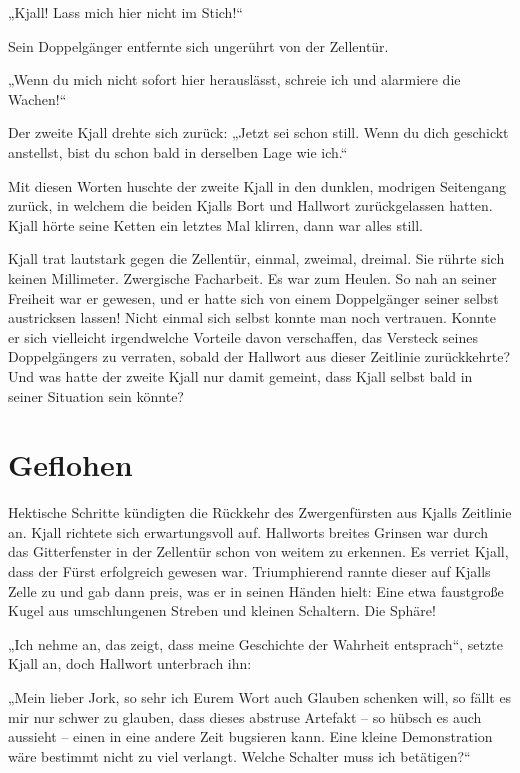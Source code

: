 „Kjall! Lass mich hier nicht im Stich!“

Sein Doppelgänger entfernte sich ungerührt von der Zellentür.

„Wenn du mich nicht sofort hier herauslässt, schreie ich und alarmiere die Wachen!“

Der zweite Kjall drehte sich zurück: „Jetzt sei schon still. Wenn du dich geschickt anstellst, bist du schon bald in derselben Lage wie ich.“

Mit diesen Worten huschte der zweite Kjall in den dunklen, modrigen Seitengang zurück, in welchem die beiden Kjalls Bort und Hallwort zurückgelassen hatten. Kjall hörte seine Ketten ein letztes Mal klirren, dann war alles still.

Kjall trat lautstark gegen die Zellentür, einmal, zweimal, dreimal. Sie rührte sich keinen Millimeter. Zwergische Facharbeit. Es war zum Heulen. So nah an seiner Freiheit war er gewesen, und er hatte sich von einem Doppelgänger seiner selbst austricksen lassen! Nicht einmal sich selbst konnte man noch vertrauen. Konnte er sich vielleicht irgendwelche Vorteile davon verschaffen, das Versteck seines Doppelgängers zu verraten, sobald der Hallwort aus dieser Zeitlinie zurückkehrte? Und was hatte der zweite Kjall nur damit gemeint, dass Kjall selbst bald in seiner Situation sein könnte?


\newpage
\section{Geflohen}



Hektische Schritte kündigten die Rückkehr des Zwergenfürsten aus Kjalls Zeitlinie an. Kjall richtete sich erwartungsvoll auf. Hallworts breites Grinsen war durch das Gitterfenster in der Zellentür schon von weitem zu erkennen. Es verriet Kjall, dass der Fürst erfolgreich gewesen war. Triumphierend rannte dieser auf Kjalls Zelle zu und gab dann preis, was er in seinen Händen hielt: Eine etwa faustgroße Kugel aus umschlungenen Streben und kleinen Schaltern. Die Sphäre!

„Ich nehme an, das zeigt, dass meine Geschichte der Wahrheit entsprach“, setzte Kjall an, doch Hallwort unterbrach ihn:

„Mein lieber Jork, so sehr ich Eurem Wort auch Glauben schenken will, so fällt es mir nur schwer zu glauben, dass dieses abstruse Artefakt – so hübsch es auch aussieht – einen in eine andere Zeit bugsieren kann. Eine kleine Demonstration wäre bestimmt nicht zu viel verlangt. Welche Schalter muss ich betätigen?“

